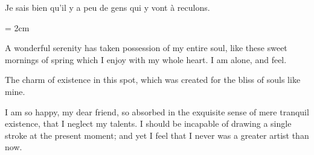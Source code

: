 \documentclass{scrbook}
\begin{document}
\parbox{3cm}{
Je sais bien qu'il y a peu de
gens qui y vont à reculons.
}


\parindent = 2cm

A wonderful serenity has taken possession of my entire soul, like these sweet mornings of spring which I enjoy with my whole heart. I am alone, and feel.

The charm of existence in this spot, which was created for the bliss of souls like mine. 

I am so happy, my dear friend, so absorbed in the exquisite sense of mere tranquil existence, that I neglect my talents. I should be
incapable of drawing a single stroke at the present moment; and yet I feel that I never was a greater artist than now.
\end{document}
